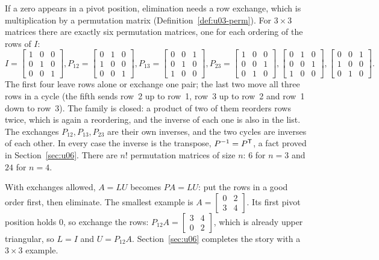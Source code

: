 If a zero appears in a pivot position, elimination needs a row exchange, which is
multiplication by a permutation matrix (Definition~\ref{def:u03-perm}). For $3\times3$
matrices there are exactly six permutation matrices, one for each ordering of the rows of $I$:
\[
  I=\begin{bmatrix} 1&0&0\\ 0&1&0\\ 0&0&1\end{bmatrix},
  P_{12}=\begin{bmatrix} 0&1&0\\ 1&0&0\\ 0&0&1\end{bmatrix},
  P_{13}=\begin{bmatrix} 0&0&1\\ 0&1&0\\ 1&0&0\end{bmatrix},
  P_{23}=\begin{bmatrix} 1&0&0\\ 0&0&1\\ 0&1&0\end{bmatrix},
  \begin{bmatrix} 0&1&0\\ 0&0&1\\ 1&0&0\end{bmatrix},
  \begin{bmatrix} 0&0&1\\ 1&0&0\\ 0&1&0\end{bmatrix}.
\]
The first four leave rows alone or exchange one pair; the last two move all three rows in a
cycle (the fifth sends row~2 up to row~1, row~3 up to row~2 and row~1 down to row~3). The
family is closed: a product of two of them reorders rows twice, which is again a reordering,
and the inverse of each one is also in the list. The exchanges $P_{12},P_{13},P_{23}$ are their
own inverses, and the two cycles are inverses of each other. In every case the inverse is the
transpose, $P^{-1}=P^{\mathsf{T}}$, a fact proved in Section~\ref{sec:u06}. There are $n!$ permutation
matrices of size $n$: $6$ for $n=3$ and $24$ for $n=4$.

With exchanges allowed, $A=LU$ becomes $PA=LU$: put the rows in a good order first, then
eliminate. The smallest example is $A=\begin{bmatrix} 0&2\\ 3&4\end{bmatrix}$. Its first pivot
position holds $0$, so exchange the rows: $P_{12}A=\begin{bmatrix} 3&4\\ 0&2\end{bmatrix}$,
which is already upper triangular, so $L=I$ and $U=P_{12}A$. Section~\ref{sec:u06} completes the
story with a $3\times3$ example.

